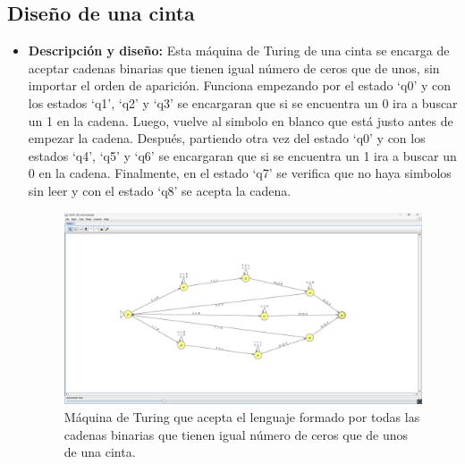 \documentclass[11pt]{report}
\begin{document}
\subsection{Diseño de una cinta}
\begin{itemize}
  \item \textbf{Descripción y diseño:} Esta máquina de Turing de una cinta se encarga de aceptar cadenas binarias que tienen igual número de ceros que de unos, sin importar el orden de aparición. Funciona empezando por el estado ‘q0’ y con los estados ‘q1’, ‘q2’ y ‘q3’ se encargaran que si se encuentra un 0 ira a buscar un 1 en la cadena. Luego, vuelve al simbolo en blanco que está justo antes de empezar la cadena. Después, 
  partiendo otra vez del estado ‘q0’ y con los estados ‘q4’, ‘q5’ y ‘q6’ se encargaran que si se encuentra un 1 ira a buscar un 0 en la cadena. Finalmente, en el estado ‘q7’ se verifica que no haya simbolos sin leer y con el estado ‘q8’ se acepta la cadena.

        \begin{figure}[H]
          \centering
          \includegraphics[scale=0.33]{img/MT_05_one_ribbon.png}
          \caption{Máquina de Turing que acepta el lenguaje formado por todas las cadenas binarias que tienen igual número de ceros que de unos de una cinta.}
          \label{fig:maquina de turing que acepta el lenguaje formado por todas las cadenas binarias que tienen igual número de ceros que de unos de una cinta}
        \end{figure}

        \newpage


\end{itemize}
\end{document}
